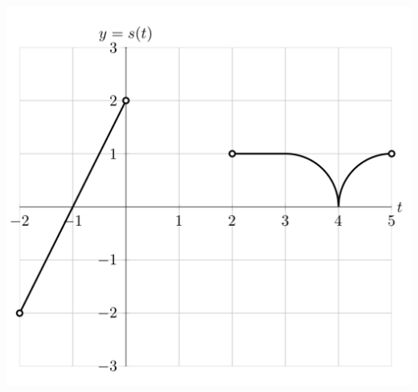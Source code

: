 \documentclass[11pt]{exam}
\begin{document}
\begin{questions}
	\vspace{-1em}
	\begin{multicols}{2}
	\includegraphics[scale=0.39]{Figures/graphs}
	

\end{multicols}
\end{questions}
\end{document}
